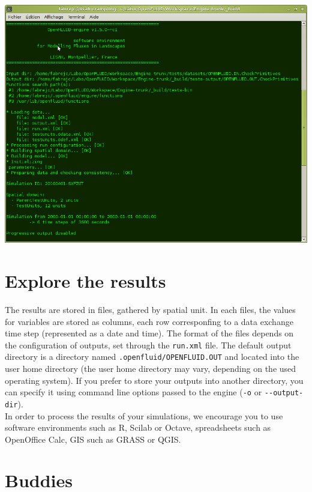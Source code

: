 \begin{htmlonly}
\begin{center}
\includegraphics[scale=0.8]{common/graphics/oferun.png}
\end{center}
\end{htmlonly}

\section{Explore the results}

The results are stored in files, gathered by spatial unit. In each files, the
values for variables are stored as columns, each row corresponfing to a data
exchange time step (represented as a date and time). The format of the files
depends on the configuration of outputs, set through the \texttt{run.xml} file.
The default output directory is a directory named
\texttt{.openfluid/OPENFLUID.OUT} and located into the user home
directory (the user home directory may vary, depending on the used operating
system). If you prefer to store your outputs into another directory, you can
specify it using command line options passed to the engine (\texttt{-o} or
\verb?--?\texttt{output-dir}).\\

\noindent In order to process the results of your simulations, we encourage you
to use software environments such as R, Scilab or Octave, spreadsheets such as
OpenOffice Calc, GIS such as GRASS or QGIS.

\section{Buddies}

